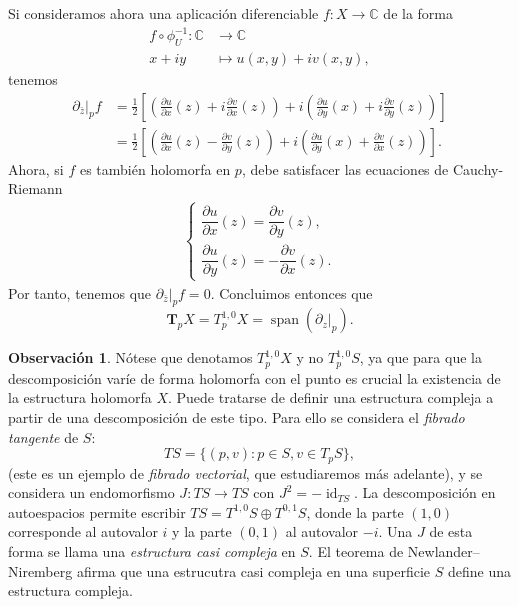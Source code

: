\documentclass[12pt,a4paper]{article}
\theoremstyle{definition} \newtheorem{defn}[thm]{Definición}
\theoremstyle{definition} \newtheorem{ejemplo}[thm]{Ejemplo}
\theoremstyle{definition} \newtheorem{ejercicio}[thm]{Ejercicio}
\newtheorem{obs}[thm]{Observación}
\def\CC{\mathbb{C}}
\DeclareMathOperator{\id}{id}
\DeclareMathOperator{\Span}{span}
\begin{document}
  Si consideramos ahora una aplicación diferenciable $f:X\rightarrow \CC$ de la forma
  \begin{align*}
    f\circ \phi_U^{-1} :\CC &\longrightarrow \CC\\ 
      x+iy &\longmapsto u(x,y) + i v(x,y), 
    \end{align*}
    tenemos
    \begin{align*}
      \partial_{\bar{z}}|_p f &= \frac{1}{2} \left[ \left( \frac{\partial u}{\partial x}(z) + i \frac{\partial v}{\partial x}(z) \right) + i\left( \frac{\partial u}{\partial y}(x) + i \frac{\partial v}{\partial y}(z) \right) \right] \\
 &= \frac{1}{2} \left[ \left( \frac{\partial u}{\partial x}(z) -  \frac{\partial v}{\partial y}(z) \right) + i\left( \frac{\partial u}{\partial y}(x) +  \frac{\partial v}{\partial x}(z) \right) \right].
    \end{align*}
    Ahora, si $f$ es también holomorfa en $p$, debe satisfacer las ecuaciones de Cauchy-Riemann
    \begin{align*}
      \begin{cases}
      \dfrac{\partial u}{\partial x}(z) = \dfrac{\partial v}{\partial y}(z), \\
      \dfrac{\partial u}{\partial y}(z) = -\dfrac{\partial v}{\partial x}(z).
      \end{cases}
    \end{align*}
    Por tanto, tenemos que $\partial_{\bar{z}}|_p f = 0$. Concluimos entonces que 
    \begin{equation*}
      \boldsymbol{T}_p X = T^{1,0}_p X = \Span(\partial_z|_p).
    \end{equation*}

    \begin{obs}
      Nótese que denotamos $T_p^{1,0}X$ y no $T_p^{1,0}S$, ya que para que la descomposición varíe de forma holomorfa con el punto es crucial la existencia de la estructura holomorfa $X$. Puede tratarse de definir una estructura compleja a partir de una descomposición de este tipo. Para ello se considera el \emph{fibrado tangente} de $S$:
      \begin{equation*}
	TS = \{(p,v) : p \in S, v\in T_p S\},
      \end{equation*}
      (este es un ejemplo de \emph{fibrado vectorial}, que estudiaremos más adelante), y se considera un endomorfismo $J:TS \rightarrow TS$ con $J^2=-\id_{TS}$. La descomposición en autoespacios permite escribir $TS= T^{1,0} S \oplus T^{0,1} S$, donde la parte $(1,0)$ corresponde al autovalor $i$ y la parte $(0,1)$ al autovalor $-i$. Una $J$ de esta forma se llama una \emph{estructura casi compleja} en $S$. El teorema de Newlander--Niremberg afirma que una estrucutra casi compleja en una superficie $S$ define una estructura compleja.
    \end{obs}
\end{document}
